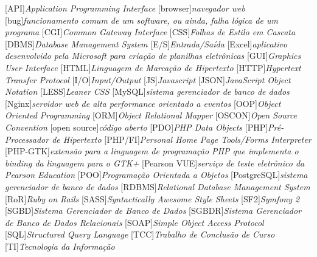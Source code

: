 
			[API]{\textit{Application Programming Interface}}
		[browser]{\textit{navegador web}}
			[bug]{\textit{funcionamento comum de um software, ou ainda, falha
lógica de um programa}}
			[CGI]{\textit{Common Gateway Interface }}
			[CSS]{\textit{Folhas de Estilo em Cascata}}
			[DBMS]{\textit{Database Management System}}
			[E/S]{\textit{Entrada/Saída}}
		[Excel]{\textit{aplicativo desenvolvido pela Microsoft para
criação de planilhas eletrônicas}}
			[GUI]{\textit{Graphics User Interface}}
			[HTML]{\textit{Linguagem de Marcação de Hipertexto}}
			[HTTP]{\textit{Hypertext Transfer Protocol}}
			[I/O]{\textit{Input/Output}}
			[JS]{\textit{Javascript}}
			[JSON]{\textit{JavaScript Object Notation}}
			[LESS]{\textit{Leaner CSS}}
		[MySQL]{\textit{sistema gerenciador de banco de dados}}
		[Nginx]{\textit{servidor web de alta performance orientado a
eventos}}
			[OOP]{\textit{Object Oriented Programming}}
			[ORM]{\textit{Object Relational Mapper}}
		[OSCON]{\textit{Open Source Convention}}
	[open source]{\textit{código aberto}}
			[PDO]{\textit{‎PHP Data Objects}}
			[PHP]{\textit{Pré-Processador de Hipertexto}}
		[PHP/FI]{\textit{Personal Home Page Tools/Forms Interpreter}}
		[PHP-GTK]{\textit{extensão para a linguagem de programação PHP
que implementa o binding da linguagem para o GTK+}}
	[Pearson VUE]{\textit{serviço de teste eletrônico da Pearson Education}}
			[POO]{\textit{Programação Orientada a Objetos}}
	[PostgreSQL]{\textit{sistema gerenciador de banco de dados}}
		[RDBMS]{\textit{Relational Database Management System}}
			[RoR]{\textit{Ruby on Rails}}
			[SASS]{\textit{Syntactically Awesome Style Sheets}}
			[SF2]{\textit{Symfony 2}}
			[SGBD]{\textit{Sistema Gerenciador de Banco de Dados}}
		[SGBDR]{\textit{Sistema Gerenciador de Banco de Dados
Relacionais}}
			[SOAP]{\textit{Simple Object Access Protocol}}
			[SQL]{\textit{Structured Query Language}}
			[TCC]{\textit{Trabalho de Conclusão de Curso}}
			[TI]{\textit{Tecnologia da Informação}}
